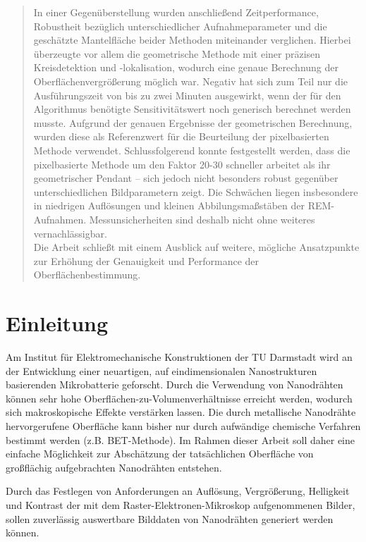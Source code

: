 \documentclass[accentcolor=tud1c, 11pt, toc=bib, toc=listof, captions=abovetable, parskip=half]{tudreport}
\begin{document}
\begin{abstract}
In einer Gegenüberstellung wurden anschließend Zeitperformance, Robustheit bezüglich unterschiedlicher Aufnahmeparameter und die geschätzte Mantelfläche beider Methoden miteinander verglichen. Hierbei überzeugte vor allem die geometrische Methode mit einer präzisen Kreisdetektion und -lokalisation, wodurch eine genaue Berechnung der Oberflächenvergrößerung möglich war. Negativ hat sich zum Teil nur die Ausführungszeit von bis zu zwei Minuten ausgewirkt, wenn der für den Algorithmus benötigte Sensitivitätswert noch generisch berechnet werden musste. Aufgrund der genauen Ergebnisse der geometrischen Berechnung, wurden diese als Referenzwert für die Beurteilung der pixelbasierten Methode verwendet. Schlussfolgerend konnte festgestellt werden, dass die pixelbasierte Methode um den Faktor 20-30 schneller arbeitet als ihr geometrischer Pendant – sich jedoch nicht besonders robust gegenüber unterschiedlichen Bildparametern zeigt. Die Schwächen liegen insbesondere in niedrigen Auflösungen und kleinen Abbilungsmaßstäben der REM-Aufnahmen. Messunsicherheiten sind deshalb nicht ohne weiteres vernachlässigbar.\\

Die Arbeit schließt mit einem Ausblick auf weitere, mögliche Ansatzpunkte zur Erhöhung der Genauigkeit und Performance der Oberflächenbestimmung.
\end{abstract}

\tableofcontents %

\chapter{Einleitung}
Am Institut für Elektromechanische Konstruktionen der TU Darmstadt wird an der Entwicklung einer neuartigen, auf eindimensionalen Nanostrukturen basierenden Mikrobatterie geforscht. Durch die Verwendung von Nanodrähten können sehr hohe Oberflächen-zu-Volumenverhältnisse erreicht werden, wodurch sich makroskopische Effekte verstärken lassen. Die durch metallische Nanodrähte hervorgerufene Oberfläche kann bisher nur durch aufwändige chemische Verfahren bestimmt werden (z.B. BET-Methode). Im Rahmen dieser Arbeit soll daher eine einfache Möglichkeit zur Abschätzung der tatsächlichen Oberfläche von großflächig aufgebrachten Nanodrähten entstehen.

Durch das Festlegen von Anforderungen an Auflösung, Vergrößerung, Helligkeit und Kontrast der mit dem Raster-Elektronen-Mikroskop aufgenommenen Bilder, sollen zuverlässig auswertbare Bilddaten von Nanodrähten generiert werden können.
\end{document}
